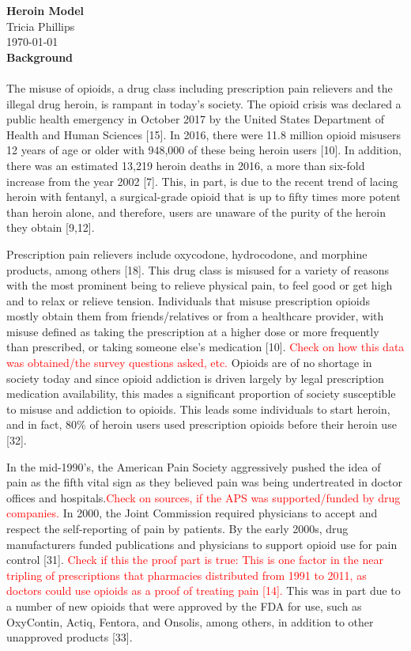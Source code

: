 \documentclass[12pt]{article}
\begin{document}
\textbf{Heroin Model} \\
Tricia Phillips \\
\today \\

\textbf{Background} \\ \\
The misuse of opioids, a drug class including prescription pain relievers and the illegal drug heroin, is rampant in today's society. The opioid crisis was declared a public health emergency in October 2017 by the United States Department of Health and Human Sciences [15]. In 2016, there were 11.8 million opioid misusers 12 years of age or older with 948,000 of these being heroin users [10]. In addition, there was an estimated 13,219 heroin deaths in 2016, a more than six-fold increase from the year 2002 [7]. This, in part, is due to the recent trend of lacing heroin with fentanyl, a surgical-grade opioid that is up to fifty times more potent than heroin alone, and therefore, users are unaware of the purity of the heroin they obtain [9,12]. 

Prescription pain relievers include oxycodone, hydrocodone, and morphine products, among others [18]. This drug class is misused for a variety of reasons with the most prominent being to relieve physical pain, to feel good or get high and to relax or relieve tension. Individuals that misuse prescription opioids mostly obtain them from friends/relatives or from a healthcare provider, with misuse defined as taking the prescription at a higher dose or more frequently than prescribed, or taking someone else's medication [10]. \textcolor{red}{Check on how this data was obtained/the survey questions asked, etc.} Opioids are of no shortage in society today and since opioid addiction is driven largely by legal prescription medication availability, this mades a significant proportion of society susceptible to misuse and addiction to opioids. This leads some individuals to start heroin, and in fact, 80\% of heroin users used prescription opioids before their heroin use [32]. 

In the mid-1990's, the American Pain Society aggressively pushed the idea of pain as the fifth vital sign as they believed pain was being undertreated in doctor offices and hospitals.\textcolor{red}{Check on sources, if the APS was supported/funded by drug companies.} In 2000, the Joint Commission required physicians to accept and respect the self-reporting of pain by patients. By the early 2000s, drug manufacturers funded publications and physicians to support opioid use for pain control [31]. \textcolor{red}{Check if this the proof part is true: This is one factor in the near tripling of prescriptions that pharmacies distributed from 1991 to 2011, as doctors could use opioids as a proof of treating pain [14].} This was in part due to a number of new opioids that were approved by the FDA for use, such as OxyContin, Actiq, Fentora, and Onsolis, among others, in addition to other unapproved products [33]. 
\end{document}
